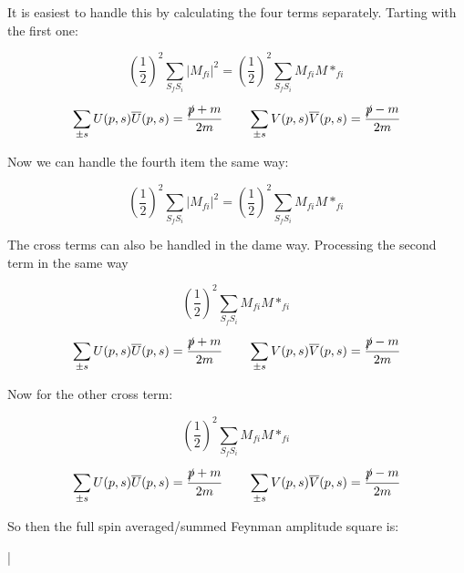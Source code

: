 \documentclass[a4]{article}
\begin{document}
    It is easiest to handle this by calculating the four terms separately. Tarting with the first one:

    \begin{equation}
        (\frac{1}{2})^2 \sum_{S_f S_i} |M_{f i}|^2 = (\frac{1}{2})^2 \sum_{S_f S_i} M_{fi} M*_{fi}
    \end{equation}

    \begin{equation}
        \sum_{\pm s} U (p, s) \overline{U} (p, s) = \frac{\slashed{p} + m}{2m} \qquad \sum_{\pm s} V (p, s) \overline{V} (p, s) = \frac{\slashed{p} - m}{2m}
    \end{equation}

    Now we can handle the fourth item the same way:

    \begin{equation}
        (\frac{1}{2})^2 \sum_{S_f S_i} |M_{f i}|^2 = (\frac{1}{2})^2 \sum_{S_f S_i} M_{fi} M*_{fi}
    \end{equation}

    The cross terms can also be handled in the dame way. Processing the second term in the same way

    \begin{equation}
        (\frac{1}{2})^2 \sum_{S_f S_i} M_{fi} M*_{fi}
    \end{equation}

    \begin{equation}
        \sum_{\pm s} U (p, s) \overline{U} (p, s) = \frac{\slashed{p} + m}{2m} \qquad \sum_{\pm s} V (p, s) \overline{V} (p, s) = \frac{\slashed{p} - m}{2m}
    \end{equation}

    Now for the other cross term:

    \begin{equation}
        (\frac{1}{2})^2 \sum_{S_f S_i} M_{fi} M*_{fi}
    \end{equation}

    \begin{equation}
        \sum_{\pm s} U (p, s) \overline{U} (p, s) = \frac{\slashed{p} + m}{2m} \qquad \sum_{\pm s} V (p, s) \overline{V} (p, s) = \frac{\slashed{p} - m}{2m}
    \end{equation}

    So then the full spin averaged/summed Feynman amplitude square is:

    \begin{framed}
        |
    \end{framed}
\end{document}
